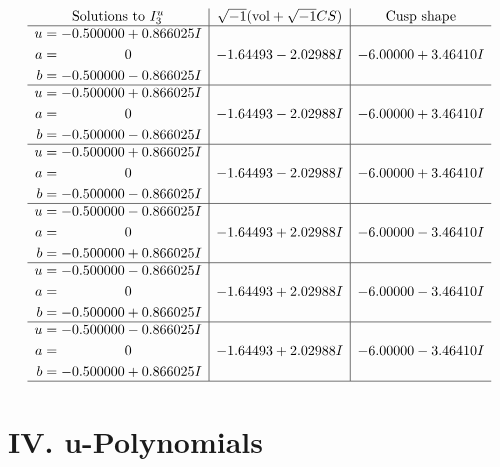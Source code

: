 \documentclass[1p]{elsarticle_modified}
\theoremstyle{definition}
\newcommand{\I}{\sqrt{-1}}
\begin{document}
$$\begin{array}{c|c|c}  
\text{Solutions to }I^u_{3}& \I (\text{vol} + \sqrt{-1}CS) & \text{Cusp shape}\\
 \hline 
\begin{aligned}
u &= -0.500000 + 0.866025 I \\
a &= \phantom{-0.000000 } 0 \\
b &= -0.500000 - 0.866025 I\end{aligned}
 & -1.64493 - 2.02988 I & -6.00000 + 3.46410 I \\ \hline\begin{aligned}
u &= -0.500000 + 0.866025 I \\
a &= \phantom{-0.000000 } 0 \\
b &= -0.500000 - 0.866025 I\end{aligned}
 & -1.64493 - 2.02988 I & -6.00000 + 3.46410 I \\ \hline\begin{aligned}
u &= -0.500000 + 0.866025 I \\
a &= \phantom{-0.000000 } 0 \\
b &= -0.500000 - 0.866025 I\end{aligned}
 & -1.64493 - 2.02988 I & -6.00000 + 3.46410 I \\ \hline\begin{aligned}
u &= -0.500000 - 0.866025 I \\
a &= \phantom{-0.000000 } 0 \\
b &= -0.500000 + 0.866025 I\end{aligned}
 & -1.64493 + 2.02988 I & -6.00000 - 3.46410 I \\ \hline\begin{aligned}
u &= -0.500000 - 0.866025 I \\
a &= \phantom{-0.000000 } 0 \\
b &= -0.500000 + 0.866025 I\end{aligned}
 & -1.64493 + 2.02988 I & -6.00000 - 3.46410 I \\ \hline\begin{aligned}
u &= -0.500000 - 0.866025 I \\
a &= \phantom{-0.000000 } 0 \\
b &= -0.500000 + 0.866025 I\end{aligned}
 & -1.64493 + 2.02988 I & -6.00000 - 3.46410 I\\
 \hline 
 \end{array}$$\newpage
\newpage\renewcommand{\arraystretch}{1}
\centering \section*{ IV. u-Polynomials}
\end{document}
